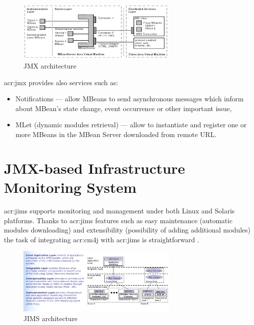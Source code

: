 \documentclass[11pt,openany]{book}
\begin{document}
      \begin{figure}[h]
        \begin{center}
          \includegraphics[width=0.7\textwidth]{img/jims/jmx.png}
        \end{center}

        \caption{JMX architecture \cite{jims}}
      \end{figure}

      \gls{acr:jmx} provides also services such as:

      \begin{itemize}
        \item Notifications --- allow MBeans to send asynchronous messages which inform about MBean's state change,
                                event occurrence or other important issue,
        \item MLet (dynamic modules retrieval) --- allow to instantiate and register one or more MBeans in the MBean
                                                   Server downloaded from remote URL.
      \end{itemize}


    \section{JMX-based Infrastructure Monitoring System}

      \gls{acr:jims} supports monitoring and management under both Linux and Solaris platforms. Thanks to \gls{acr:jims}
      features such as easy maintenance (automatic modules downloading) and extensibility (possibility of adding
      additional modules) the task of integrating \gls{acr:cm4j} with \gls{acr:jims} is straightforward \cite{jims}.
    
      \begin{figure}[H]
        \begin{center}
          \includegraphics[width=0.7\textwidth]{img/jims/jims.png}
        \end{center}
        \caption{JIMS architecture \cite{jims}}
      \end{figure}
\end{document}

